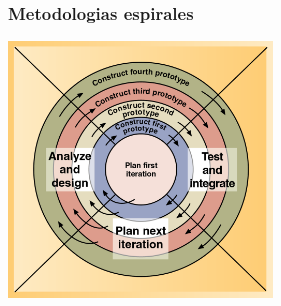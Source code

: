 \documentclass{beamer}
\begin{document}
\begin{frame}
    \frametitle{Metodologias espirales}
    \begin{center}
    \includegraphics[width=7cm]{./spiral.jpg}
    \end{center}
\end{frame}
\end{document}
